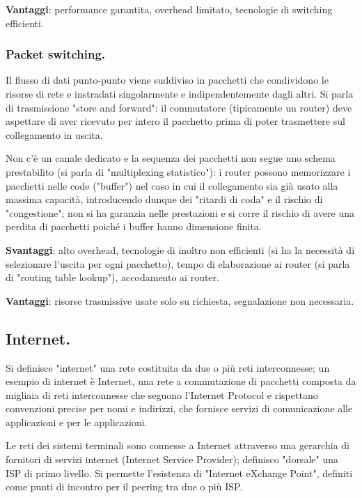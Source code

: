 \documentclass[11pt, italian, openany]{book}
\begin{document}
\begin{sloppypar}
\textbf{Vantaggi}: performance garantita, overhead limitato, tecnologie di switching efficienti.

\subsubsection*{Packet switching.}
Il flusso di dati punto-punto viene suddiviso in pacchetti che condividono le risorse di rete e instradati singolarmente e indipendentemente
dagli altri. Si parla di trasmissione "store and forward": il commutatore (tipicamente un router) deve aspettare di aver ricevuto per intero il
pacchetto prima di poter trasmettere sul collegamento in uscita.

Non c’\`e un canale dedicato e la sequenza dei pacchetti non segue uno schema prestabilito (si parla di "multiplexing statistico"): i router
possono memorizzare i pacchetti nelle code ("buffer") nel caso in cui il collegamento sia gi\`a usato alla massima capacit\`a, introducendo
dunque dei "ritardi di coda" e il rischio di "congestione"; non si ha garanzia nelle prestazioni e si corre il rischio di avere una perdita
di pacchetti poich\'e i buffer hanno dimensione finita.

\textbf{Svantaggi}: alto overhead, tecnologie di inoltro non efficienti (si ha la necessit\`a di selezionare l’uscita per ogni pacchetto),
tempo di elaborazione ai router (si parla di "routing table lookup"), accodamento ai router.

\textbf{Vantaggi}: risorse trasmissive usate solo su richiesta, segnalazione non necessaria.

\subsection{Internet.}
Si definisce "internet" una rete costituita da due o pi\`u reti interconnesse; un esempio di internet \`e Internet, una rete a commutazione di
pacchetti composta da migliaia di reti interconnesse che seguono l'Internet Protocol e rispettano convenzioni precise per nomi e indirizzi, che
fornisce servizi di comunicazione alle applicazioni e per le applicazioni.

Le reti dei sistemi terminali sono connesse a Internet attraverso una gerarchia di fornitori di servizi internet (Internet Service Provider);
definisco "dorsale" una ISP di primo livello. Si permette l'esistenza di "Internet eXchange Point", definiti come punti di incontro per il peering
tra due o pi\`u ISP.


\end{sloppypar}
\end{document}
